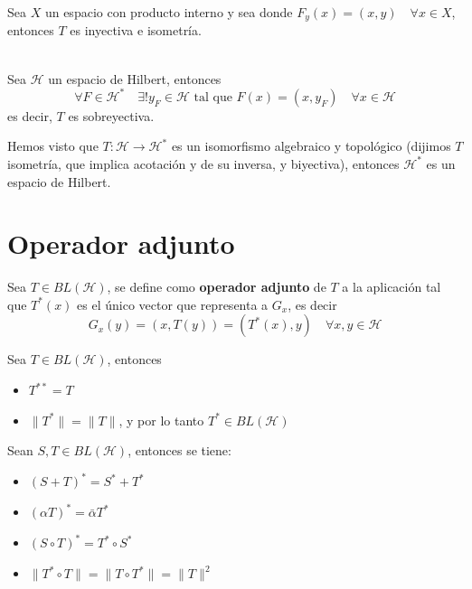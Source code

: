 \documentclass[12pt]{book}
\begin{document}
\begin{observacion}
    Sea $X$ un espacio con producto interno y sea 
    donde $F_y(x) = (x, y) \quad \forall x \in X$, entonces $T$ es inyectiva e isometría. \\ \\
\end{observacion}


\begin{teo}
    Sea $\mathcal{H}$ un espacio de Hilbert, entonces 
    \begin{equation*}
        \forall F \in \mathcal{H}^* \quad \exists! y_F \in \mathcal{H} \text{ tal que } F(x) = (x, y_F) \quad \forall x \in \mathcal{H}
    \end{equation*}
    es decir, $T$ es sobreyectiva.
\end{teo}
\begin{observacion}
    Hemos visto que $T: \mathcal{H} \longrightarrow \mathcal{H}^*$ es un isomorfismo algebraico y topológico (dijimos $T$ isometría, que implica acotación y de su inversa, y biyectiva), entonces $\mathcal{H}^*$ es un espacio de Hilbert.
\end{observacion}


\section{Operador adjunto}
\begin{definicion}
    Sea $T \in BL(\mathcal{H})$, se define como \textbf{operador adjunto} de $T$ a la aplicación
    tal que $T^*(x)$ es el único vector que representa a $G_x$, es decir
    \[ G_x(y)=(x, T(y)) = (T^*(x), y) \quad \forall x, y \in \mathcal{H} \]
\end{definicion}

\begin{prop}
    Sea $T\in BL(\mathcal{H})$, entonces 
    \begin{itemize}
        \item[i)] $T^{**} = T$
        \item[ii)] $\|T^*\| = \|T\|$, y por lo tanto $T^* \in BL(\mathcal{H})$
    \end{itemize}
\end{prop}

\begin{prop}
    Sean $S, T \in BL(\mathcal{H})$, entonces se tiene:
    \begin{itemize}
        \item $(S + T)^* = S^* + T^*$
        \item $(\alpha T)^* = \bar{\alpha} T^*$
        \item $(S \circ T)^* = T^* \circ S^*$
        \item $\|T^* \circ T\| = \|T \circ T^*\| = \|T\|^2$ \\
    \end{itemize}
\end{prop}
\end{document}

